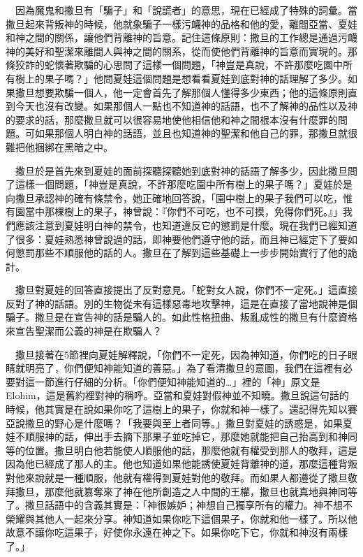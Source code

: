 \documentclass{book}
\begin{document}
　因為魔鬼和撒旦有「騙子」和「說謊者」的意思，現在已經成了特殊的詞彙。當撒旦起來背叛神的時候，他就象騙子一樣污衊神的品格和他的愛，離間亞當、夏娃和神之間的關係，讓他們背離神的旨意。記住這條原則：撒旦的工作總是通過污衊神的美好和聖潔來離間人與神之間的關系，從而使他們背離神的旨意而實現的。那條狡詐的蛇懷著欺騙的心思問了這樣一個問題，「神豈是真說，不許那麼吃園中所有樹上的果子嗎？」他問夏娃這個問題是想看看夏娃到底對神的話理解了多少。如果撒旦想要欺騙一個人，他一定會首先了解那個人懂得多少東西；他的這條原則直到今天也沒有改變。如果那個人一點也不知道神的話語，也不了解神的品性以及神的要求的話，那麼撒旦就可以很容易地使他相信他和神之間根本沒有什麼罪的問題。可如果那個人明白神的話語，並且也知道神的聖潔和他自己的罪，那撒旦就很難把他捆綁在黑暗之中。

　撒旦於是首先來到夏娃的面前探聽探聽她到底對神的話語了解多少，因此撒旦問了這樣一個問題，「神豈是真說，不許那麼吃園中所有樹上的果子嗎？」夏娃於是向撒旦承認神的確有條禁令，她正確地回答說，「園中樹上的果子我們可以吃，惟有園當中那棵樹上的果子，神曾說：『你們不可吃，也不可摸，免得你們死。』」我們應該注意到夏娃明白神的禁令，也知道違反它的懲罰是什麼。現在我們已經知道了很多：夏娃熟悉神曾說過的話，即神要他們遵守他的話，而且神已經定下了要如何懲罰那些不順服他的話的人。撒旦在了解到這些基礎上一步步開始實行了他的詭計。

　撒旦對夏娃的回答直接提出了反對意見。「蛇對女人說，你們不一定死。」這直接反對了神的話語。別的生物從未有這樣惡毒地攻擊神，這是在直接了當地說神是個騙子。撒旦是在宣告神的話是騙人的。如此性格扭曲、叛亂成性的撒旦有什麼資格來宣告聖潔而公義的神是在欺騙人？

　撒旦接著在5節裡向夏娃解釋說，「你們不一定死，因為神知道，你們吃的日子眼睛就明亮了，你們便知神能知道的善惡。」為了看清撒旦的意圖，我們在這裡有必要對這一節進行仔細的分析。「你們便知神能知道的…」裡的「神」原文是Elohim，這是舊約裡對神的稱呼。亞當和夏娃對假神並不知曉。撒旦說這句話的時候，他其實是在說如果你吃了這樹上的果子，你就和神一樣了。還記得先知以賽亞說撒旦的野心是什麼嗎？「我要與至上者同等。」撒旦對夏娃的誘惑是，如果夏娃不順服神的話，伸出手去摘下那果子並吃掉它，那麼她就能把自己抬高到和神同等的位置。撒旦明白他若能使人順服他的話，那麼他就有權受到那人的敬拜，這是因為他已經成了那人的主。他也知道如果他能誘使夏娃背離神的道，那麼這種背叛對他來說就是一種順服，他就有權得到夏娃對他的敬拜。而如果人都遵從了撒旦敬拜撒旦，那麼他就篡奪來了神在他所創造之人中間的王權，撒旦也就真地與神同等了。撒旦話語中的含義其實是：「神很嫉妒；神想自己獨享所有的權力。神不想不榮耀與其他人一起來分享。神知道如果你吃下這個果子，你就和他一樣了。所以他故意不讓你吃這果子，好使你永遠在神之下。如果你吃下它，你就和神沒有兩樣了。」
\end{document}
